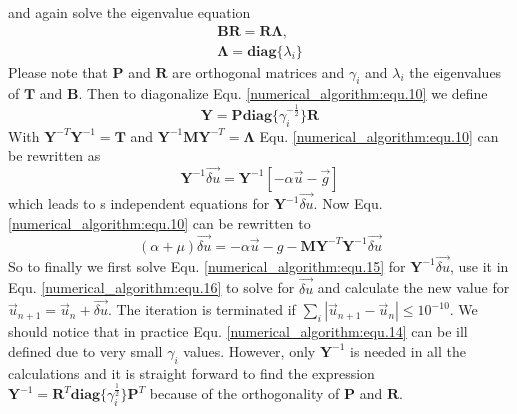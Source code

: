 and again solve the eigenvalue equation
\begin{equation}
	\begin{gathered}
		\mathbf{B} \mathbf{R} = \mathbf{R} \mathbf{\Lambda},\\
		\mathbf{\Lambda} = \mathbf{diag} \{\lambda_i\}
	\end{gathered}
	\label{numerical_algorithm:equ.13}
\end{equation}
Please note that $\mathbf{P}$ and $\mathbf{R}$ are orthogonal matrices and $\gamma_i$ and $\lambda_i$ the eigenvalues of $\mathbf{T}$ and $\mathbf{B}$. Then to diagonalize Equ. \ref{numerical_algorithm:equ.10} we define 
\begin{equation}
	\mathbf{Y} = \mathbf{P} \mathbf{diag}\{ \gamma_i^{-\frac{1}{2}}\} \mathbf{R}
	\label{numerical_algorithm:equ.14}
\end{equation}
With $\mathbf{Y}^{-T}\mathbf{Y}^{-1} = \mathbf{T}$ and $\mathbf{Y}^{-1}\mathbf{M}\mathbf{Y}^{-T} = \mathbf{\Lambda}$ Equ. \ref{numerical_algorithm:equ.10} can be rewritten as
\begin{equation}
	[( \alpha + \mu) \mathbf{I} +\mathbf{\Lambda}]\mathbf{Y}^{-1} \vec{\delta u} = \mathbf{Y}^{-1}[ -\alpha \vec u - \vec g]
	\label{numerical_algorithm:equ.15}
\end{equation}
which leads to s independent equations for $\mathbf{Y}^{-1} \vec{\delta u}$.
Now Equ. \ref{numerical_algorithm:equ.10} can be rewritten to
\begin{equation}
	(\alpha + \mu)\vec{\delta u} = -\alpha \vec u - g - \mathbf{M}\mathbf{Y}^{-T}\mathbf{Y}^{-1} \vec{\delta u}
	\label{numerical_algorithm:equ.16}
\end{equation}
So to finally we first solve Equ. \ref{numerical_algorithm:equ.15} for $\mathbf{Y}^{-1} \vec{\delta u}$, use it in Equ. \ref{numerical_algorithm:equ.16} to solve for $\vec{\delta u}$ and calculate the new value for $\vec u_{n+1} = \vec u_{n} + \vec{\delta u}$. The iteration is terminated if $\sum_i |\vec u_{n+1} - \vec u_{n}| \leq 10^{-10}$. We should notice that in practice Equ. \ref{numerical_algorithm:equ.14} can be ill defined due to very small $\gamma_i$ values. However, only $\mathbf{Y}^{-1}$ is needed in all the calculations and it is straight forward to find the expression $\mathbf{Y}^{-1} = \mathbf{R}^T \mathbf{diag} \{ \gamma_i^{\frac{1}{2}}\}\mathbf{P}^T$ because of the orthogonality of $\mathbf{P}$ and $\mathbf{R}$.

